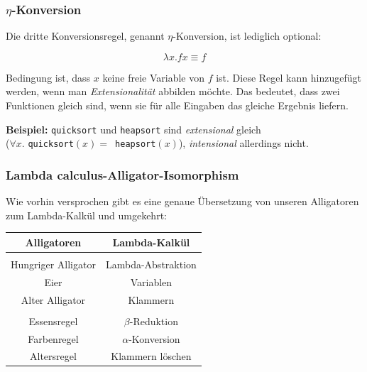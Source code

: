 \documentclass{beamer}
\begin{document}

\begin{frame}
\frametitle{$\eta$-Konversion}

Die dritte Konversionsregel, genannt $\eta$-Konversion, ist lediglich optional:

$$ \lambda x . f x \equiv f$$
\pause

Bedingung ist, dass $x$ keine freie Variable von $f$ ist. Diese Regel kann hinzugefügt werden, wenn man \emph{Extensionalität} abbilden möchte. Das bedeutet, dass zwei Funktionen gleich sind, wenn sie für alle Eingaben das gleiche Ergebnis liefern.\pause\bigskip

\textbf{Beispiel:} \texttt{quicksort} und \texttt{heapsort} sind \emph{extensional} gleich
\\($\forall x . $ \texttt{quicksort}$(x) = $\texttt{ heapsort}$(x) $), \emph{intensional} allerdings nicht.
\end{frame}


\begin{frame}
\frametitle{Lambda calculus-Alligator-Isomorphism}

Wie vorhin versprochen gibt es eine genaue Übersetzung von unseren Alligatoren zum
Lambda-Kalkül und umgekehrt:\pause\bigskip

\begin{center}
\begin{tabular}{c|c}
\textbf{Alligatoren} & \textbf{Lambda-Kalkül}\\
\hline
\\
Hungriger Alligator & Lambda-Abstraktion\\
Eier & Variablen\\
Alter Alligator & Klammern\\
&\\
Essensregel & $\beta$-Reduktion\\
Farbenregel & $\alpha$-Konversion\\
Altersregel & Klammern löschen\\ 

\end{tabular}
\end{center}

\end{frame}

\end{document}
